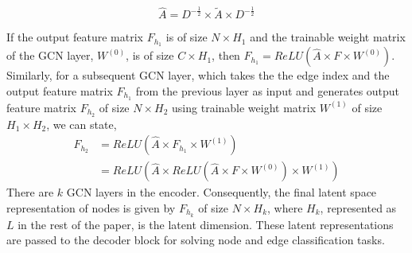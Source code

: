 \vspace*{-\baselineskip}
\begin{equation}
\widehat{A} = D^{-\frac{1}{2}}\times \widetilde{A} \times D^{-\frac{1}{2}}
\end{equation}


\begin{comment}
\textcolor{violet}{The scale factor of $\widetilde{A}$ could be only $D^{-1}$ making $\widehat{A} = D^{-1}\times \widetilde{A}$. From this perspective, each row $i$ of $\widetilde{A}$ will be scaled by $D_{i,i}$. If we scale each row $i$ by $D_{i,i}$, intuitively we can understand that we should do the same for its corresponding column too. Mathematically we are scaling $\widetilde{A}_{i,j}$ only by $D_{i,i}$. We are ignoring the $j$ index. So, we should scale $\widetilde{A}_{i,j}$ by both $D_{i,i}$ and $D_{j,j}$ making $\widehat{A} = D^{-1}\times \widetilde{A}\times D^{-1}$. Here we actually normalize twice, one time for the row, and another time for the column. It would make sense if we rebalance by modifying $\left(D_{i,i}\times D_{j,j}\right)$ to $\sqrt{D_{i,i}\times D_{j,j}}$. In other words, instead of using $D^{-1}$ we use $D^{-\frac{1}{2}}$. So, we further alter the formula to $\widehat{A} = D^{-\frac{1}{2}}\times \widetilde{A} \times D^{-\frac{1}{2}}$.}
\end{comment}

If the output feature matrix $F_{h_1}$ is of size $N \times H_1$ and the trainable weight matrix of the GCN layer, $W^{(0)}$, is of size $C \times H_1$, then $F_{h_1} = ReLU(\widehat{A} \times F \times W^{(0)})$.
Similarly, for a subsequent GCN layer, which takes the the edge index and the output feature matrix $F_{h_1}$ from the previous layer as input and generates output feature matrix $F_{h_2}$ of size $N \times H_2$ using trainable weight matrix $W^{(1)}$ of size $H_1 \times H_2$, we can state,
\begin{equation}
\begin{split}
F_{h_2} & = ReLU(\widehat{A} \times F_{h_1} \times W^{(1)})\\
& = ReLU(\widehat{A} \times ReLU(\widehat{A} \times F \times W^{(0)}) \times W^{(1)})
\end{split}
\end{equation}
There are $k$ GCN layers in the encoder. Consequently, the final latent space representation of nodes is given by $F_{h_k}$ of size $N \times H_k$, where $H_k$, represented as $L$ in the rest of the paper, is the latent dimension. These latent representations are passed to the decoder block for solving node and edge classification tasks.


